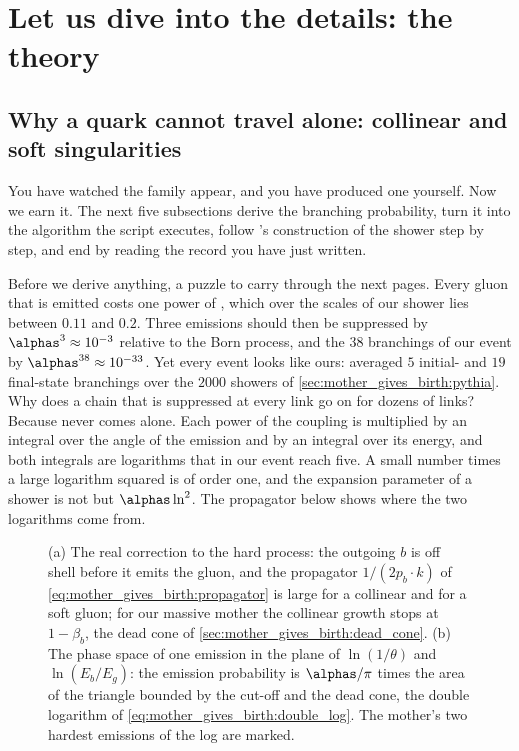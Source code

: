 \section{Let us dive into the details: the theory}
\label{sec:mother_gives_birth:theory}

\subsection{Why a quark cannot travel alone: collinear and soft singularities}
\label{sec:mother_gives_birth:why_alone}

You have watched the family appear, and you have produced one yourself. Now
we earn it. The next five subsections derive the branching probability, turn
it into the algorithm the script executes, follow \PYTHIA's construction of
the shower step by step, and end by reading the record you have just
written.

Before we derive anything, a puzzle to carry through the next pages. Every
gluon that is emitted costs one power of \alphas, which over the scales of
our shower lies between $0.11$ and $0.2$. Three emissions should then be
suppressed by $\alphas^3\approx10^{-3}$ relative to the Born process, and
the $38$ branchings of our event by $\alphas^{38}\approx10^{-33}$. Yet
every event looks like ours: \PYTHIA averaged $5$ initial- and $19$
final-state branchings over the $2000$ showers of
\cref{sec:mother_gives_birth:pythia}. Why does a chain that is suppressed
at every link go on for dozens of links? Because \alphas never comes alone.
Each power of the coupling is multiplied by an integral over the angle of
the emission and by an integral over its energy, and both integrals are
logarithms that in our event reach five. A small number times a large
logarithm squared is of order one, and the expansion parameter of a shower
is not \alphas but $\alphas\ln^2$. The propagator below shows where the two
logarithms come from.

\begin{figure}[htbp]\centering
\resizebox{\textwidth}{!}{}
\caption[The propagator that makes a quark radiate, and the double-logarithmic phase space]{(a) The real correction to the hard process: the outgoing $b$ is off shell before it emits the gluon, and the propagator $1/(2p_b\cdot k)$ of \cref{eq:mother_gives_birth:propagator} is large for a collinear and for a soft gluon; for our massive mother the collinear growth stops at $1-\beta_b$, the dead cone of \cref{sec:mother_gives_birth:dead_cone}. (b) The phase space of one emission in the plane of $\ln(1/\theta)$ and $\ln(E_b/E_g)$: the emission probability is $\alphas/\pi$ times the area of the triangle bounded by the cut-off and the dead cone, the double logarithm of \cref{eq:mother_gives_birth:double_log}. The mother's two hardest emissions of the  log are marked.}
\label{fig:mother_gives_birth:propagator_sketch}
\end{figure}


